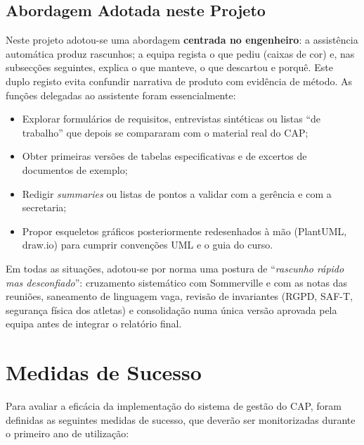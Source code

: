 \documentclass[a4paper,12pt]{scrreprt}
\begin{document}
\subsection{Abordagem Adotada neste Projeto}

Neste projeto adotou-se uma abordagem \textbf{centrada no engenheiro}: a assistência automática produz rascunhos; a equipa regista o que pediu (caixas de cor) e, nas subsecções seguintes, explica o que manteve, o que descartou e porquê. Este duplo registo evita confundir narrativa de produto com evidência de método. As funções delegadas ao assistente foram essencialmente:

\begin{itemize}
    \item Explorar formulários de requisitos, entrevistas sintéticas ou listas ``de trabalho'' que depois se compararam com o material real do CAP;
    \item Obter primeiras versões de tabelas especificativas e de excertos de documentos de exemplo;
    \item Redigir \textit{summaries} ou listas de pontos a validar com a gerência e com a secretaria;
    \item Propor esqueletos gráficos posteriormente redesenhados à mão (PlantUML, draw.io) para cumprir convenções UML e o guia do curso.
\end{itemize}

Em todas as situações, adotou-se por norma uma postura de ``\textit{rascunho rápido mas desconfiado}'': cruzamento sistemático com Sommerville e com as notas das reuniões, saneamento de linguagem vaga, revisão de invariantes (RGPD, SAF-T, segurança física dos atletas) e consolidação numa única versão aprovada pela equipa antes de integrar o relatório final.

\section{Medidas de Sucesso}

Para avaliar a eficácia da implementação do sistema de gestão do CAP, foram definidas as seguintes medidas de sucesso, que deverão ser monitorizadas durante o primeiro ano de utilização:
\end{document}
